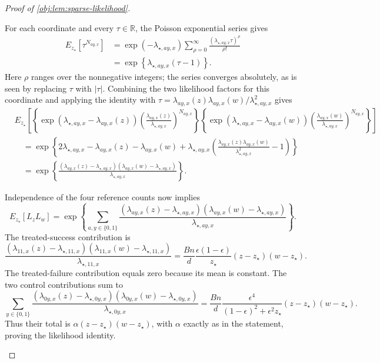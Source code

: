 \documentclass[11pt]{article}
\begin{document}
\begin{proof}[Proof of \cref{obj:lem:sparse-likelihood}]
\begin{enumerate}
For each coordinate and every \(\tau\in\mathbb R\), the Poisson exponential series gives
\[
\begin{aligned}
E_{z_\star}\!\left[\tau^{N_{ay,x}}\right]
&=\exp(-\lambda_{\star,ay,x})
\sum_{\rho=0}^{\infty}
\frac{(\lambda_{\star,ay,x}\tau)^\rho}{\rho!}\\
&=\exp\!\left\{\lambda_{\star,ay,x}(\tau-1)\right\}.
\end{aligned}
\]
Here \(\rho\) ranges over the nonnegative integers; the series converges absolutely, as is seen by replacing \(\tau\) with \(|\tau|\). Combining the two likelihood factors for this coordinate and applying the identity with
\(\tau=\lambda_{ay,x}(z)\lambda_{ay,x}(w)/\lambda_{\star,ay,x}^2\) gives
\[
\begin{aligned}
&E_{z_\star}\!\left[
\left\{\exp(\lambda_{\star,ay,x}-\lambda_{ay,x}(z))
\left(\frac{\lambda_{ay,x}(z)}{\lambda_{\star,ay,x}}\right)^{N_{ay,x}}\right\}
\left\{\exp(\lambda_{\star,ay,x}-\lambda_{ay,x}(w))
\left(\frac{\lambda_{ay,x}(w)}{\lambda_{\star,ay,x}}\right)^{N_{ay,x}}\right\}
\right]\\
&\quad=
\exp\!\left\{
2\lambda_{\star,ay,x}-\lambda_{ay,x}(z)-\lambda_{ay,x}(w)
+\lambda_{\star,ay,x}
\left(\frac{\lambda_{ay,x}(z)\lambda_{ay,x}(w)}
{\lambda_{\star,ay,x}^2}-1\right)
\right\}\\
&\quad=
\exp\!\left\{
\frac{(\lambda_{ay,x}(z)-\lambda_{\star,ay,x})
(\lambda_{ay,x}(w)-\lambda_{\star,ay,x})}
{\lambda_{\star,ay,x}}
\right\}.
\end{aligned}
\]

Independence of the four reference counts now implies
\[
E_{z_\star}[L_zL_w]
=\exp\!\left\{
\sum_{a,y\in\{0,1\}}
\frac{(\lambda_{ay,x}(z)-\lambda_{\star,ay,x})
(\lambda_{ay,x}(w)-\lambda_{\star,ay,x})}
{\lambda_{\star,ay,x}}
\right\}.
\]
The treated-success contribution is
\[
\frac{(\lambda_{11,x}(z)-\lambda_{\star,11,x})
(\lambda_{11,x}(w)-\lambda_{\star,11,x})}
{\lambda_{\star,11,x}}
=
\frac{Bn}{d}\frac{\epsilon(1-\epsilon)}{z_\star}
(z-z_\star)(w-z_\star).
\]
The treated-failure contribution equals zero because its mean is constant. The two control contributions sum to
\[
\sum_{y\in\{0,1\}}
\frac{(\lambda_{0y,x}(z)-\lambda_{\star,0y,x})
(\lambda_{0y,x}(w)-\lambda_{\star,0y,x})}
{\lambda_{\star,0y,x}}
=
\frac{Bn}{d}
\frac{\epsilon^4}{(1-\epsilon)^2+\epsilon^2z_\star}
(z-z_\star)(w-z_\star).
\]
Thus their total is \(\alpha(z-z_\star)(w-z_\star)\), with \(\alpha\) exactly as in the statement, proving the likelihood identity.


\end{enumerate}
\end{proof}
\end{document}
